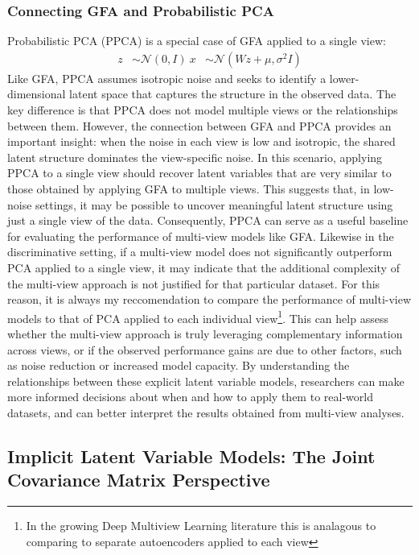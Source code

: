 \subsubsection{Connecting GFA and Probabilistic PCA}
Probabilistic PCA (PPCA) \citep{tipping1999probabilistic} is a special case of GFA applied to a single view:
\begin{align}
z &\sim \mathcal{N}(0, I)\
x &\sim \mathcal{N}(W z + \mu, \sigma^2 I)
\end{align}
Like GFA, PPCA assumes isotropic noise and seeks to identify a lower-dimensional latent space that captures the structure in the observed data. The key difference is that PPCA does not model multiple views or the relationships between them.
However, the connection between GFA and PPCA provides an important insight: when the noise in each view is low and isotropic, the shared latent structure dominates the view-specific noise. In this scenario, applying PPCA to a single view should recover latent variables that are very similar to those obtained by applying GFA to multiple views.
This suggests that, in low-noise settings, it may be possible to uncover meaningful latent structure using just a single view of the data. Consequently, PPCA can serve as a useful baseline for evaluating the performance of multi-view models like GFA. Likewise in the discriminative setting, if a multi-view model does not significantly outperform PCA applied to a single view, it may indicate that the additional complexity of the multi-view approach is not justified for that particular dataset.
For this reason, it is always my reccomendation to compare the performance of multi-view models to that of PCA applied to each individual view\footnote{In the growing Deep Multiview Learning literature this is analagous to comparing to separate autoencoders applied to each view}. This can help assess whether the multi-view approach is truly leveraging complementary information across views, or if the observed performance gains are due to other factors, such as noise reduction or increased model capacity.
By understanding the relationships between these explicit latent variable models, researchers can make more informed decisions about when and how to apply them to real-world datasets, and can better interpret the results obtained from multi-view analyses.

\subsection{Implicit Latent Variable Models: The Joint Covariance Matrix Perspective}

